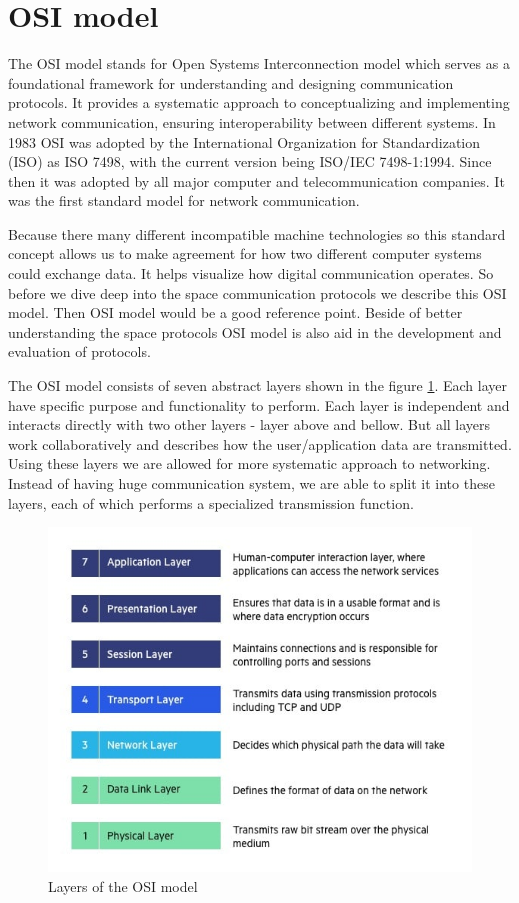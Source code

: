 \documentclass[conference]{IEEEtran}
\begin{document}
\section{OSI model}
The OSI model stands for Open Systems Interconnection model which serves as a foundational framework for understanding and designing communication protocols. It provides a systematic approach to conceptualizing and implementing network communication, ensuring interoperability between different systems. In 1983 OSI was adopted by the International Organization for Standardization (ISO) as ISO 7498, with the current version being ISO/IEC 7498-1:1994\cite{AWS-Amazon}. Since then it was adopted by all major computer and telecommunication companies. It was the first standard model for network communication. \cite{impreva-osi}

Because there many different incompatible machine technologies so this standard concept allows us to make agreement for how two different computer systems could exchange data. It helps visualize how digital communication operates. So before we dive deep into the space communication protocols we describe this OSI model. Then OSI model would be a good reference point. Beside of better understanding the space protocols OSI model is also aid in the development and evaluation of protocols.

The OSI model consists of seven abstract layers shown in the figure \ref{osi}. Each layer have specific purpose and functionality to perform. Each layer is independent and interacts directly with two other layers - layer above and bellow. But all layers work collaboratively and describes how the user/application data are transmitted. Using these layers we are allowed for more systematic approach to networking. Instead of having huge communication system, we are able to split it into these layers, each of which performs a specialized transmission function. \cite{geeks-osi}

\begin{figure}[htbp]
	\centerline{\includegraphics[scale=0.5]{images/OSI-7-layers}}
	\caption{Layers of the OSI model\cite{impreva-osi}}
	\label{osi}
\end{figure}
\end{document}
